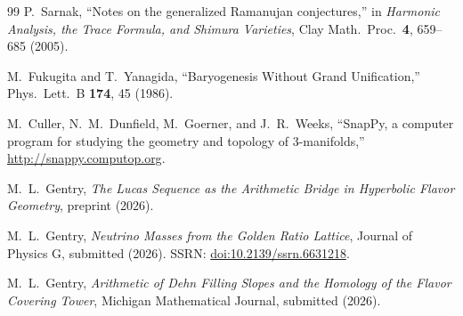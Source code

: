 ﻿\documentclass[12pt]{article}
\theoremstyle{definition}
\begin{document}
\begin{thebibliography}{99}
  P.~Sarnak,
  ``Notes on the generalized Ramanujan conjectures,''
  in \emph{Harmonic Analysis, the Trace Formula, and Shimura Varieties},
  Clay Math.\ Proc.\ \textbf{4}, 659--685 (2005).

  M.~Fukugita and T.~Yanagida,
  ``Baryogenesis Without Grand Unification,''
  Phys.\ Lett.\ B \textbf{174}, 45 (1986).

  M.~Culler, N.~M.~Dunfield, M.~Goerner, and J.~R.~Weeks,
  ``SnapPy, a computer program for studying the geometry and topology of 3-manifolds,''
  \url{http://snappy.computop.org}.

M.~L.~Gentry,
\textit{The Lucas Sequence as the Arithmetic Bridge in Hyperbolic Flavor Geometry},
preprint (2026).

M.~L.~Gentry,
\textit{Neutrino Masses from the Golden Ratio Lattice},
Journal of Physics G, submitted (2026). SSRN: \href{https://doi.org/10.2139/ssrn.6631218}{doi:10.2139/ssrn.6631218}.

M.~L.~Gentry,
\textit{Arithmetic of Dehn Filling Slopes and the Homology of the Flavor Covering Tower},
Michigan Mathematical Journal, submitted (2026).

\end{thebibliography}
\end{document}
